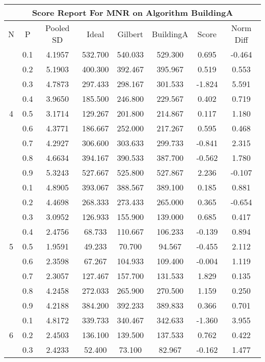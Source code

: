 \documentclass[11pt,a4paper]{report}
\begin{document}
\begin{longtable}{ | c | c || c | c | c | c | c | c | }
\hline
\multicolumn{8}{|c|}{ Score Report For MNR on Algorithm BuildingA} \\
\hline
N & P & Pooled SD &  Ideal &  Gilbert & BuildingA  & Score & Norm Diff \\
 \hline
 \hline
 \endhead
\multirow{9}{*}{4} & 0.1 & 4.1957 & 532.700 & 540.033 & 529.300 & 0.695 & -0.464 \\
 & 0.2 & 5.1903 & 400.300 & 392.467 & 395.967 & 0.519 & 0.553 \\
 & 0.3 & 4.7873 & 297.433 & 298.167 & 301.533 & -1.824 & 5.591 \\
 & 0.4 & 3.9650 & 185.500 & 246.800 & 229.567 & 0.402 & 0.719 \\
 & 0.5 & 3.1714 & 129.267 & 201.800 & 214.867 & 0.117 & 1.180 \\
 & 0.6 & 4.3771 & 186.667 & 252.000 & 217.267 & 0.595 & 0.468 \\
 & 0.7 & 4.2927 & 306.600 & 303.633 & 299.733 & -0.841 & 2.315 \\
 & 0.8 & 4.6634 & 394.167 & 390.533 & 387.700 & -0.562 & 1.780 \\
 & 0.9 & 5.3243 & 527.667 & 525.800 & 527.867 & 2.236 & -0.107 \\
 \hline
\multirow{9}{*}{5} & 0.1 & 4.8905 & 393.067 & 388.567 & 389.100 & 0.185 & 0.881 \\
 & 0.2 & 4.4698 & 268.333 & 273.433 & 265.000 & 0.365 & -0.654 \\
 & 0.3 & 3.0952 & 126.933 & 155.900 & 139.000 & 0.685 & 0.417 \\
 & 0.4 & 2.4756 & 68.733 & 110.667 & 106.233 & -0.139 & 0.894 \\
 & 0.5 & 1.9591 & 49.233 & 70.700 & 94.567 & -0.455 & 2.112 \\
 & 0.6 & 2.3598 & 67.267 & 104.933 & 109.400 & -0.004 & 1.119 \\
 & 0.7 & 2.3057 & 127.467 & 157.700 & 131.533 & 1.829 & 0.135 \\
 & 0.8 & 4.2458 & 272.033 & 265.900 & 270.500 & 1.159 & 0.250 \\
 & 0.9 & 4.2188 & 384.200 & 392.233 & 389.833 & 0.366 & 0.701 \\
 \hline
\multirow{9}{*}{6} & 0.1 & 4.8172 & 339.733 & 340.467 & 342.633 & -1.360 & 3.955 \\
 & 0.2 & 2.4503 & 136.100 & 139.500 & 137.533 & 0.762 & 0.422 \\
 & 0.3 & 2.4233 & 52.400 & 73.100 & 82.967 & -0.162 & 1.477 \\

\end{longtable}
\end{document}
